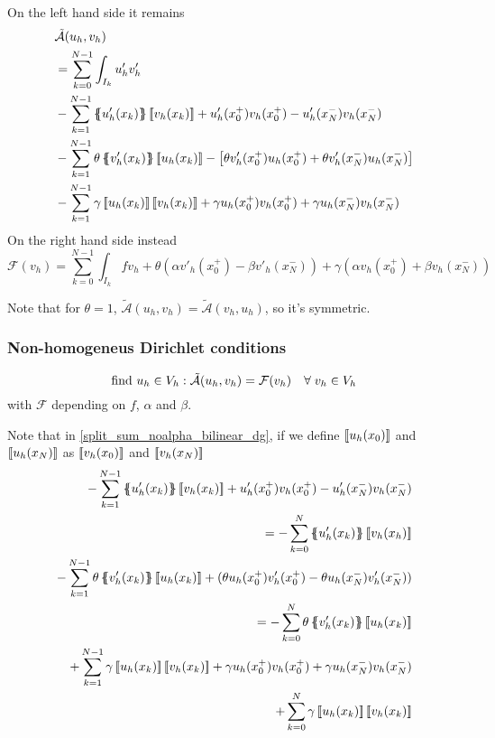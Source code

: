 On the left hand side it remains 
\begin{equation}
    \begin{split}
        & \tilde{\mathcal{A}} (u_h, v_h) \\
        & = \sum_{k=0}^{N-1} \int_{I_k} u'_hv'_h \\
        & - \sum_{k=1}^{N-1} \average{u'_h(x_k)}\jump{v_h(x_k)} + u'_h(x^+_0)v_h(x^+_0) - u'_h(x_N^-)v_h(x_N^-) \\
        & - \sum_{k=1}^{N-1} \theta \average{v'_h(x_k)} \jump{u_h(x_k)} - \left[\theta v'_h(x^+_0)u_h(x^+_0) + \theta v'_h(x^-_N)u_h(x^-_N)\right] \\
        & - \sum_{k=1}^{N-1} \gamma \jump{u_h(x_k)} \jump{v_h(x_k)} + \gamma u_h(x^+_0)v_h(x^+_0) + \gamma u_h(x_N^-)v_h(x_N^-) \label{split_sum_noalpha_bilinear_dg}
    \end{split}
\end{equation}
On the right hand side instead
\begin{equation}
    \mathcal{F}(v_h) = \sum_{k=0}^{N-1} \int_{I_k} f v_h + \theta(\alpha v'_h(x^+_0) - \beta v'_h(x_N^-)) + \gamma(\alpha v_h(x^+_0) + \beta v_h(x^-_N))
\end{equation}
\begin{remark}
    Note that for \(\theta = 1\), \(\tilde{\mathcal{A}}(u_h, v_h) = \tilde{\mathcal{A}}(v_h, u_h)\), so it's symmetric.
\end{remark}
\subsubsection*{Non-homogeneus Dirichlet conditions}
\begin{equation}
    \text{find } u_h \in V_h : \tilde{\mathcal{A}}(u_h, v_h) = \mathcal{F}(v_h) \quad \forall \; v_h \in V_h
    \label{functional_dg}
\end{equation}
with \(\mathcal{F}\) depending on \(f\), \(\alpha\) and \(\beta\).

Note that in \eqref{split_sum_noalpha_bilinear_dg}, if we define \(\left[\!\left[u_h(x_0)\right]\!\right]\) and \(\left[\!\left[u_h(x_N)\right]\!\right]\) as \(\left[\!\left[v_h(x_0)\right]\!\right]\) and \(\left[\!\left[v_h(x_N)\right]\!\right]\)
\begin{equation*}
    \begin{split}
        -\sum_{k=1}^{N-1} \average{u'_h(x_k)} \jump{v_h(x_k)} + u'_h(x_0^+)v_h(x^+_0) - u'_h(x_N^-)v_h(x_N^-) \\
        = -\sum_{k=0}^{N} \average{u'_h(x_k)} \jump{v_h(x_h)} \\
         -\sum_{k=1}^{N-1} \theta \average{v'_h(x_k)} \jump{u_h(x_k)} + (\theta u_h(x_0^+)v'_h(x_0^+) - \theta u_h(x_N^-)v'_h(x_N^-)) \\
        = - \sum_{k=0}^{N} \theta \average{v'_h(x_k)}\jump{u_h(x_k)} \\
        + \sum_{k=1}^{N-1} \gamma \jump{u_h(x_k)} \jump{v_h(x_k)} + \gamma u_h(x_0^+)v_h(x_0^+) + \gamma u_h(x_N^-)v_h(x_N^-) \\
        + \sum_{k=0}^{N} \gamma \jump{u_h(x_k)}\jump{v_h(x_k)}
    \end{split}
\end{equation*}
